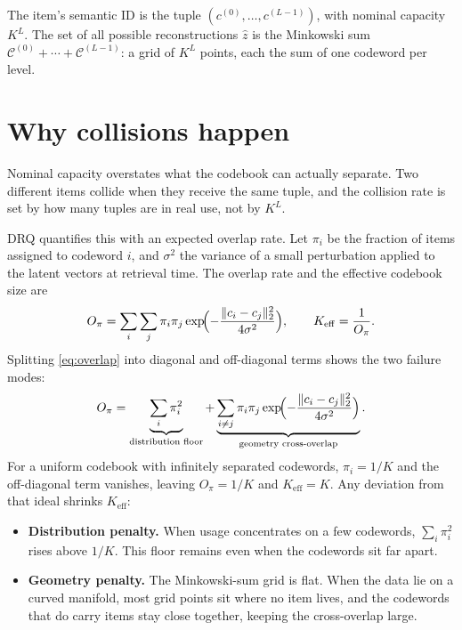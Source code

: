 \documentclass[11pt]{article}
\begin{document}
The item's semantic ID is the tuple $(c^{(0)}, \dots, c^{(L-1)})$, with nominal
capacity $K^L$. The set of all possible reconstructions $\hat z$ is the Minkowski
sum $\mathcal{C}^{(0)} + \cdots + \mathcal{C}^{(L-1)}$: a grid of $K^L$ points,
each the sum of one codeword per level.

\section{Why collisions happen}

Nominal capacity overstates what the codebook can actually separate. Two
different items collide when they receive the same tuple, and the collision rate
is set by how many tuples are in real use, not by $K^L$.

DRQ quantifies this with an expected overlap rate. Let $\pi_i$ be the fraction
of items assigned to codeword $i$, and $\sigma^2$ the variance of a small
perturbation applied to the latent vectors at retrieval time. The overlap rate
and the effective codebook size are
\begin{equation}
  O_\pi = \sum_{i} \sum_{j} \pi_i \pi_j
          \exp\!\Bigl( -\frac{\| c_i - c_j \|_2^2}{4 \sigma^2} \Bigr),
  \qquad
  K_{\mathrm{eff}} = \frac{1}{O_\pi}.
  \label{eq:overlap}
\end{equation}
Splitting \eqref{eq:overlap} into diagonal and off-diagonal terms shows the two
failure modes:
\begin{equation}
  O_\pi =
    \underbrace{\sum_{i} \pi_i^2}_{\text{distribution floor}}
    + \underbrace{\sum_{i \ne j} \pi_i \pi_j
      \exp\!\Bigl( -\frac{\| c_i - c_j \|_2^2}{4 \sigma^2} \Bigr)}_{\text{geometry cross-overlap}}.
  \label{eq:split}
\end{equation}
For a uniform codebook with infinitely separated codewords, $\pi_i = 1/K$ and
the off-diagonal term vanishes, leaving $O_\pi = 1/K$ and $K_{\mathrm{eff}} = K$.
Any deviation from that ideal shrinks $K_{\mathrm{eff}}$:

\begin{itemize}[nosep]
  \item \textbf{Distribution penalty.} When usage concentrates on a few codewords,
    $\sum_i \pi_i^2$ rises above $1/K$. This floor remains even when the
    codewords sit far apart.
  \item \textbf{Geometry penalty.} The Minkowski-sum grid is flat. When the data
    lie on a curved manifold, most grid points sit where no item lives, and the
    codewords that do carry items stay close together, keeping the cross-overlap
    large.
\end{itemize}
\end{document}
